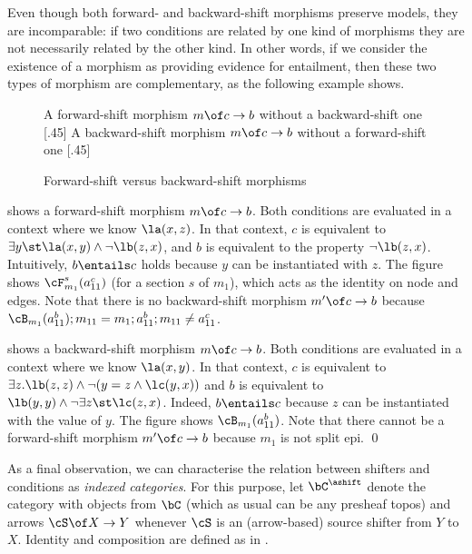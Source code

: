 \medskip\noindent
Even though both forward- and backward-shift morphisms preserve models, they are incomparable: if two conditions are related by one kind of morphisms they are not necessarily related by the other kind. In other words, if we consider the existence of a morphism as providing evidence for entailment, then these two types of morphism are complementary, as the following example shows.
%
\begin{figure}[t]
\centering
\subcaptionbox
  {A forward-shift morphism $m \of c \to b$ without a backward-shift one
  }
  [.45\textwidth]
  {}
  \qquad
\subcaptionbox
  {A backward-shift morphism $m \of c \to b$ without a forward-shift one
  }
  [.45\textwidth]
  {}
\caption{Forward-shift versus backward-shift morphisms}
\end{figure}
%
\begin{example}
 shows a forward-shift morphism $m \of c \to b$. 
Both conditions are evaluated in a context where we know $\la(x,z)$. In that context,  $c$ is equivalent to $\exists y\st \la(x,y) \wedge \neg \lb(z,x)$, and $b$ is equivalent to the property $\neg \lb(z,x)$. Intuitively, $b\entails c$ holds because $y$ can be instantiated with $z$. The figure shows $\cF_{m_1}^s(a^c_{11})$ (for a section $s$ of $m_1$), which acts as the identity on node and edges. Note that there is no backward-shift morphism $m'\of c \to b$ because $\cB_{m_1}(a^b_{11}) ; m_{11} = m_1; a^b_{11} ; m_{11} \not = a^c_{11}$.

 shows a backward-shift morphism $m \of c \to b$. 
Both conditions are evaluated in a context where we know $\la(x,y)$. In that context, $c$ is equivalent to $\exists z.\lb(z,z) \wedge \neg(y=z \wedge \lc(y,x))$ and $b$ is equivalent to $\lb(y,y) \wedge \neg \exists z\st \lc(z,x)$.
Indeed, $b\entails c$ because $z$ can be instantiated with the value of $y$. The figure shows $\cB_{m_1}(a^b_{11})$. Note that there cannot be a forward-shift morphism $m'\of c \to b$ because $m_1$ is not split epi.
\qed
\end{example}
%
As a final observation, we can characterise the relation between shifters and conditions as \emph{indexed categories}. For this purpose, let $\bC^\ashift$ denote the category with objects from $\bC$ (which as usual can be any presheaf topos) and arrows $\cS\of X\to Y$ whenever $\cS$ is an (arrow-based) source shifter from $Y$ to $X$. Identity and composition are defined as in .

